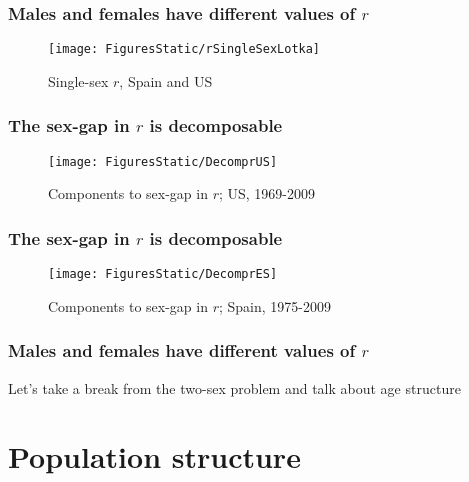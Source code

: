 \documentclass{beamer}
\begin{document}

\begin{frame}
  \frametitle{Males and females have different values of $r$}
  \vspace{-2em}
  \begin{figure}
  \centering
  \caption*{Single-sex $r$, Spain and US}
  \texttt{[image: FiguresStatic/rSingleSexLotka]}
\end{figure}
\end{frame}


\begin{frame}
  \frametitle{The sex-gap in $r$ is decomposable}
  \vspace{-2em}
\begin{figure}
\centering
\caption*{Components to sex-gap in $r$; US, 1969-2009}
\texttt{[image: FiguresStatic/DecomprUS]}
\end{figure}
\end{frame}


\begin{frame}
  \frametitle{The sex-gap in $r$ is decomposable}
  \vspace{-2em}
\begin{figure}
\centering
\caption*{Components to sex-gap in $r$; Spain, 1975-2009}
\texttt{[image: FiguresStatic/DecomprES]}
\end{figure}
\end{frame}


\begin{frame}
  \frametitle{Males and females have different values of $r$}
Let's take a break from the two-sex problem and talk about age structure
\end{frame}


\section{Population structure}
\end{document}
